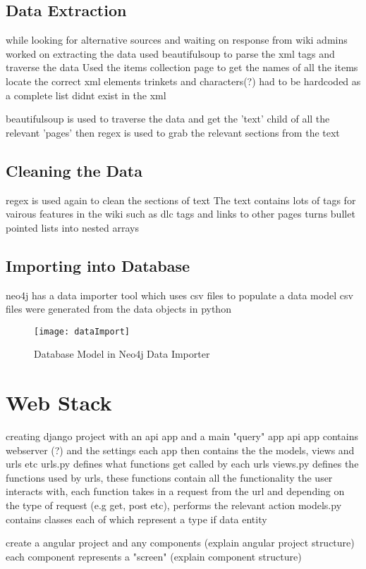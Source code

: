 \subsection{Data Extraction}
while looking for alternative sources and waiting on response from wiki admins worked on extracting the data
used beautifulsoup to parse the xml tags and traverse the data
Used the items collection page to get the names of all the items locate the correct xml elements
trinkets and characters(?) had to be hardcoded as a complete list didnt exist in the xml

beautifulsoup is used to traverse the data and get the 'text' child of all the relevant 'pages'
then regex is used to grab the relevant sections from the text
\subsection{Cleaning the Data}
regex is used again to clean the sections of text
The text contains lots of tags for vairous features in the wiki such as dlc tags and links to other pages
turns bullet pointed lists into nested arrays
\subsection{Importing into Database}
neo4j has a data importer tool which uses csv files to populate a data model
csv files were generated from the data objects in python
\begin{figure}[H]
    \centering
    \texttt{[image: dataImport]}
    \caption{Database Model in Neo4j Data Importer}
\end{figure}
\section{Web Stack}
creating django project with an api app and a main "query" app
api app contains webserver (?) and the settings
each app then contains the the models, views and urls etc
urls.py defines what functions get called by each urls
views.py defines the functions used by urls, these functions contain all the functionality the user interacts with,
each function takes in a request from the url and depending on the type of request (e.g get, post etc), performs the relevant action
models.py contains classes each of which represent a type if data entity

create a angular project and any components
(explain angular project structure)
each component represents a "screen"
(explain component structure)

